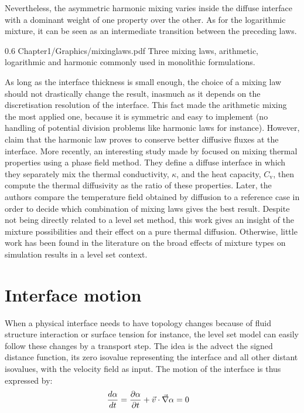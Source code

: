 Nevertheless, the asymmetric harmonic mixing varies inside the diffuse interface with a dominant weight of one property 
over the other. As for the logarithmic mixture, it can be seen as an intermediate transition between the preceding laws.
\begin{figureth}
{0.6}
{Chapter1/Graphics/mixinglaws.pdf}
{Three mixing laws, arithmetic, logarithmic and harmonic commonly used in monolithic formulations.}
\label{fig:mixinglaws}
\end{figureth}
As long as the interface thickness is small enough, the choice of a mixing law should not drastically change the result, 
inasmuch as it depends on the discretisation resolution of the interface. This fact made the arithmetic mixing
the most applied one, because it is symmetric and easy to implement (no handling of potential division problems like harmonic laws for instance). 
However, \citet{strotos_numerical_2008} claim that the harmonic law proves to conserve better diffusive fluxes at the interface.
More recently, an interesting study made by \citet{ettrich_modelling_2014} focused on mixing thermal properties using a phase field method.
They define a diffuse interface in which they separately mix the thermal conductivity, $\kappa$, and the heat capacity, $C_\text{v}$,
then compute the thermal diffusivity as the ratio of these properties. Later, the authors compare the temperature field obtained by diffusion
to a reference case in order to decide which combination of mixing laws gives the best result. Despite not being directly related to a level set 
method, this work gives an insight of the mixture possibilities and their effect on a pure thermal diffusion.
Otherwise, little work has been found in the literature on the broad effects of mixture types on simulation results in a level set context.
%
\section{Interface motion} %
When a physical interface needs to have topology changes because
of fluid structure interaction or surface tension for instance, the level set model 
can easily follow these changes by a transport step. The idea is the advect the signed distance
function, its zero isovalue representing the interface and all other distant isovalues, with the
velocity field as input. The motion of the interface is thus expressed by:
\begin{align}
\label{eq:transport_strong}
& \frac{d \alpha}{d t}  = \frac{\partial \alpha}{\partial t} + \vec{v} \cdot \vec{\nabla} \alpha = 0
\end{align}
%
%
